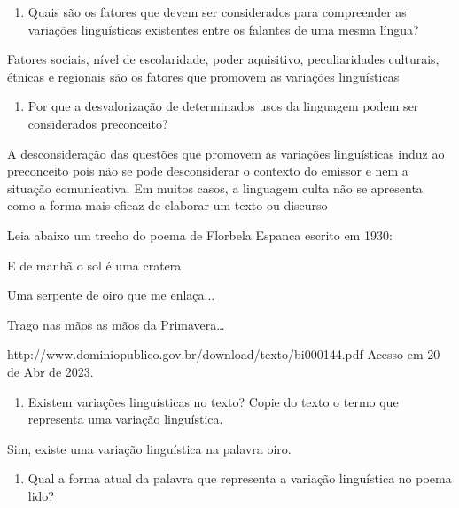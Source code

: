 {

\begin{enumerate}
\def\labelenumi{\arabic{enumi})}
\tightlist
\item
  Quais são os fatores que devem ser considerados para compreender as
  variações linguísticas existentes entre os falantes de uma mesma
  língua?
\end{enumerate}

Fatores sociais, nível de escolaridade, poder aquisitivo, peculiaridades
culturais, étnicas e regionais são os fatores que promovem as variações
linguísticas

\begin{enumerate}
\def\labelenumi{\arabic{enumi})}
\setcounter{enumi}{1}
\tightlist
\item
  Por que a desvalorização de determinados usos da linguagem podem ser
  considerados preconceito?
\end{enumerate}

A desconsideração das questões que promovem as variações linguísticas
induz ao preconceito pois não se pode desconsiderar o contexto do
emissor e nem a situação comunicativa. Em muitos casos, a linguagem
culta não se apresenta como a forma mais eficaz de elaborar um texto ou
discurso

Leia abaixo um trecho do poema de Florbela Espanca escrito em 1930:

E de manhã o sol é uma cratera,

Uma serpente de oiro que me enlaça...

Trago nas mãos as mãos da Primavera\ldots{}

http://www.dominiopublico.gov.br/download/texto/bi000144.pdf Acesso em
20 de Abr de 2023.

\begin{enumerate}
\def\labelenumi{\arabic{enumi})}
\setcounter{enumi}{2}
\tightlist
\item
  Existem variações linguísticas no texto? Copie do texto o termo que
  representa uma variação linguística.
\end{enumerate}

Sim, existe uma variação linguística na palavra oiro.

\begin{enumerate}
\def\labelenumi{\arabic{enumi})}
\setcounter{enumi}{3}
\tightlist
\item
  Qual a forma atual da palavra que representa a variação linguística no
  poema lido?
\end{enumerate}

}

